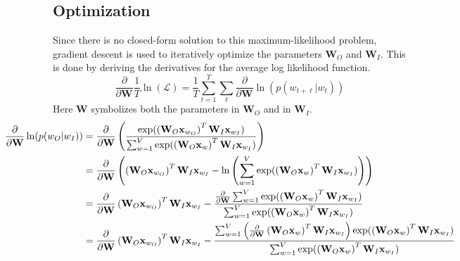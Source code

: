 \subsection{Optimization}

Since there is no closed-form solution to this maximum-likelihood problem, gradient descent is used to iteratively optimize the parameters $\mathbf{W}_O$ and $\mathbf{W}_I$. This is done by deriving the derivatives for the average log likelihood function. 
\begin{equation}
\frac{\partial}{\partial \mathbf{W}} \frac{1}{T} \ln( \mathcal{L} ) = \frac{1}{T} \sum_{t = 1}^T \sum_{\ell} \frac{\partial}{\partial \mathbf{W}} \ln( p(w_{t + \ell} | w_t) )
\end{equation}
Here $\mathbf{W}$ symbolizes both the parameters in $\mathbf{W}_O$ and in $\mathbf{W}_I$. 
\begin{equation*}
\centerline{$
\begin{aligned}
\frac{\partial}{\partial \mathbf{W}} \ln( p(w_O | w_I) ) &= \frac{\partial}{\partial \mathbf{W}} 	 \left( \frac{
	\mathrm{exp}( \left( \mathbf{W}_O \mathbf{x}_{w_O} \right)^T \mathbf{W}_I \mathbf{x}_{w_I} )
}{
	\sum_{w=1}^V \mathrm{exp}( \left( \mathbf{W}_O \mathbf{x}_{w} \right)^T \mathbf{W}_I \mathbf{x}_{w_I} )
} \right) \\
&= \frac{\partial}{\partial \mathbf{W}} \left( \left( \mathbf{W}_O \mathbf{x}_{w_O} \right)^T \mathbf{W}_I \mathbf{x}_{w_I} - \ln \left(\sum_{w=1}^V \mathrm{exp}( \left( \mathbf{W}_O \mathbf{x}_{w} \right)^T \mathbf{W}_I \mathbf{x}_{w_I}) \right) \right) \\
&= \frac{\partial}{\partial \mathbf{W}} \left( \mathbf{W}_O \mathbf{x}_{w_O} \right)^T \mathbf{W}_I \mathbf{x}_{w_I} - \frac{
	\frac{\partial}{\partial \mathbf{W}} \sum_{w=1}^V \mathrm{exp}( \left( \mathbf{W}_O \mathbf{x}_{w} \right)^T \mathbf{W}_I \mathbf{x}_{w_I})
} {
	\sum_{w=1}^V \mathrm{exp}( \left( \mathbf{W}_O \mathbf{x}_{w} \right)^T \mathbf{W}_I \mathbf{x}_{w_I})
} \\
&= \frac{\partial}{\partial \mathbf{W}} \left( \mathbf{W}_O \mathbf{x}_{w_O} \right)^T \mathbf{W}_I \mathbf{x}_{w_I} - \frac{
	\sum_{w=1}^V \left(\frac{\partial}{\partial \mathbf{W}} \left(\mathbf{W}_O \mathbf{x}_{w} \right)^T \mathbf{W}_I \mathbf{x}_{w_I} \right) \mathrm{exp}( \left( \mathbf{W}_O \mathbf{x}_{w} \right)^T \mathbf{W}_I \mathbf{x}_{w_I})
} {
	\sum_{w=1}^V \mathrm{exp}( \left( \mathbf{W}_O \mathbf{x}_{w} \right)^T \mathbf{W}_I \mathbf{x}_{w_I})
}
\end{aligned}$}
\end{equation*}

